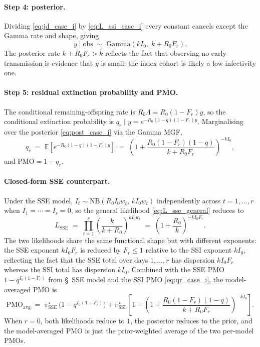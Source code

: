 \documentclass{article}
\theoremstyle{definition}
\begin{document}
\paragraph{Step 4: posterior.}
Dividing \eqref{eq:jd_case_i} by \eqref{eq:L_ssi_case_i} every constant
cancels except the Gamma rate and shape, giving
\begin{equation}\label{eq:post_case_i}
  y \mid \mathrm{obs}
  \;\sim\; \mathrm{Gamma}(k I_0,\; k + R_0 F_r).
\end{equation}
The posterior rate $k + R_0 F_r > k$ reflects the fact that observing
no early transmission is evidence that $y$ is small: the index cohort
is likely a low-infectivity one.

\paragraph{Step 5: residual extinction probability and PMO.}
The conditional remaining-offspring rate is
$R_0 \Lambda = R_0(1 - F_r) y$, so the conditional extinction
probability is $q_r \mid y = e^{-R_0(1-q)(1-F_r) y}$.  Marginalising
over the posterior \eqref{eq:post_case_i} via the Gamma MGF,
\begin{equation}\label{eq:qr_case_i}
  q_r
  \;=\; \mathbb{E}\!\left[e^{-R_0(1-q)(1-F_r)y}\right]
  \;=\; \left(1 + \frac{R_0(1 - F_r)(1 - q)}{k + R_0 F_r}\right)^{-k I_0},
\end{equation}
and $\mathrm{PMO} = 1 - q_r$.

\paragraph{Closed-form SSE counterpart.}
Under the SSE model, $I_t \sim \mathrm{NB}(R_0 I_0 w_t,\, k I_0 w_t)$
independently across $t = 1, \ldots, r$ when $I_1 = \cdots = I_r = 0$,
so the general likelihood \eqref{eq:L_sse_general} reduces to
\begin{equation}\label{eq:L_sse_case_i}
  L_\mathrm{SSE}
  \;=\; \prod_{t=1}^r \left(\frac{k}{k + R_0}\right)^{k I_0 w_t}
  \;=\; \left(1 + \frac{R_0}{k}\right)^{-k I_0 F_r}.
\end{equation}
The two likelihoods share the same functional shape but with different
exponents: the SSE exponent $k I_0 F_r$ is reduced by $F_r \leq 1$
relative to the SSI exponent $k I_0$, reflecting the fact that the SSE
total over days $1, \ldots, r$ has dispersion $k I_0 F_r$ whereas the
SSI total has dispersion $k I_0$.  Combined with the SSE PMO
$1 - q^{I_0(1 - F_r)}$ from \S~SSE model and the SSI PMO
\eqref{eq:qr_case_i}, the model-averaged PMO is
\begin{equation}\label{eq:pmo_avg_case_i}
  \mathrm{PMO}_\mathrm{avg}
  \;=\; \pi_\mathrm{SSE}^\star\,\bigl(1 - q^{I_0(1 - F_r)}\bigr)
  + \pi_\mathrm{SSI}^\star\,\left[
    1 - \left(1 + \frac{R_0(1 - F_r)(1 - q)}{k + R_0 F_r}\right)^{-k I_0}
  \right].
\end{equation}
When $r = 0$, both likelihoods reduce to $1$, the posterior reduces to
the prior, and the model-averaged PMO is just the prior-weighted
average of the two per-model PMOs.
\end{document}
